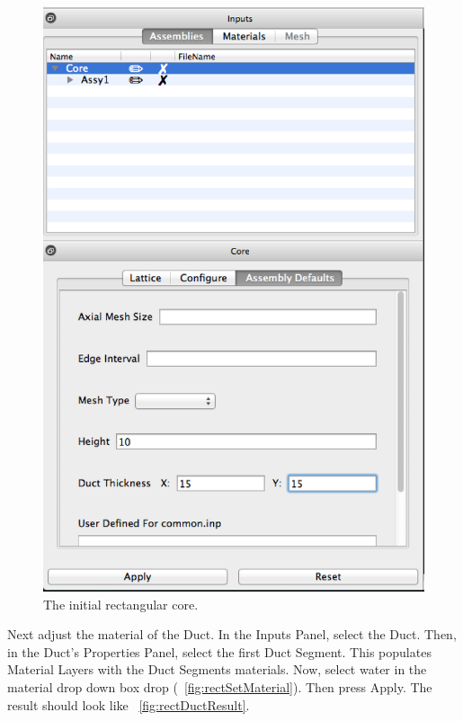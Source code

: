 \begin{figure}[htb]
\begin{center}
\includegraphics[width=0.5\linewidth]{Images/rect-set-dim.png}
\caption{The initial rectangular core.}
\label{fig:SetRectDuctDem}
\end{center}
\end{figure}

Next adjust the material of the Duct.  In the Inputs Panel, select the Duct.  Then, in the Duct's Properties Panel, select the first Duct Segment.  This populates Material Layers with the Duct Segments materials.  Now, select water in the material drop down box drop (~\ref{fig:rectSetMaterial}).  Then press Apply.  The result should look like ~\ref{fig:rectDuctResult}.

